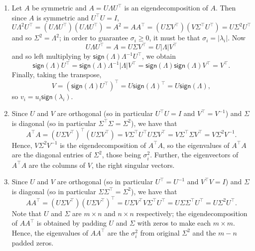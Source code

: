 \documentclass{../../../kin_math}
\begin{document}
\begin{questions}
\begin{solution}
    \begin{enumerate}[label=(\arabic*)]
      \item Let $A$ be symmetric and $A = U \Lambda U^\top$ is an eigendecomposition of $A$. Then since $A$ is symmetric and $U^\top U = I$,
      \begin{equation*}
        U \Lambda^2 U^\top = (U \Lambda U^\top)(U \Lambda U^\top) = A^2 = AA^\top = (U \Sigma V^\top)(V \Sigma^\top U^\top) = U \Sigma^2 U^\top
      \end{equation*}
      and so $\Sigma^2 = \Lambda^2$; in order to guarantee $\sigma_i \geq 0$, it must be that $\sigma_i = |\lambda_i|$. Now
      \begin{equation*}
        U \Lambda U^\top = A = U \Sigma V^\top = U |\Lambda| V^\top
      \end{equation*}
      and so left multiplying by $\textsf{sign}(\Lambda) \Lambda^{-1} U^\top$, we obtain
      \begin{equation*}
        \textsf{sign}(\Lambda) U^\top = \textsf{sign}(\Lambda) \Lambda^{-1} |\Lambda| V^\top = \textsf{sign}(\Lambda) \textsf{sign}(\Lambda) V^\top = V^\top.
      \end{equation*}
      Finally, taking the transpose,
      \begin{equation*}
        V = (\textsf{sign}(\Lambda) U^\top)^\top = U \textsf{sign}(\Lambda)^\top = U \textsf{sign}(\Lambda),
      \end{equation*}
      so $v_i = u_i \textsf{sign}(\lambda_i)$.
      \item Since $U$ and $V$ are orthogonal (so in particular $U^\top U = I$ and $V^\top = V^{-1}$) and $\Sigma$ is diagonal (so in particular $\Sigma^\top \Sigma = \Sigma^2$), we have that
      \begin{equation*}
        A^\top A = (U \Sigma V^\top)^\top (U \Sigma V^\top) = V \Sigma^\top U^\top U \Sigma V^\top = V \Sigma^\top \Sigma V^\top = V \Sigma^2 V^{-1}.
      \end{equation*}
      Hence, $V \Sigma^2 V^{-1}$ is the eigendecomposition of $A^\top A$, so the eigenvalues of $A^\top A$ are the diagonal entries of $\Sigma^2$, those being $\sigma_i^2$. Further, the eigenvectors of $A^\top A$ are the columns of $V$, the right singular vectors.
      \item Since $U$ and $V$ are orthogonal (so in particular $U^\top = U^{-1}$ and $V^\top V = I$) and $\Sigma$ is diagonal (so in particular $\Sigma \Sigma^\top = \Sigma^2$), we have that
      \begin{equation*}
        AA^\top = (U \Sigma V^\top)(U \Sigma V^\top)^\top = U \Sigma V^\top V \Sigma^\top U^\top = U\Sigma \Sigma^\top U^\top = U \Sigma^2 U^\top.
      \end{equation*}
      Note that $U$ and $\Sigma$ are $m \times n$ and $n \times n$ respectively; the eigendecomposition of $AA^\top$ is obtained by padding $U$ and $\Sigma$ with zeros to make each $m \times m$. Hence, the eigenvalues of $A A^\top$ are the $\sigma_i^2$ from original $\Sigma^2$ and the $m - n$ padded zeros.


\end{enumerate}
\end{solution}
\end{questions}
\end{document}
